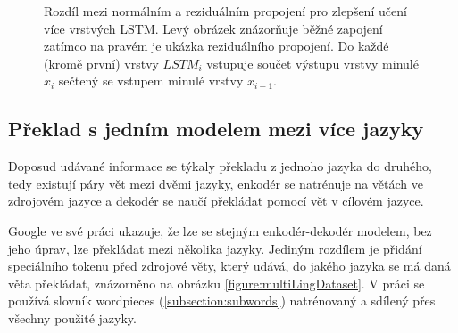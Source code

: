 \begin{figure}[H]
    \begin{center}
    \end{center}
	\caption{Rozdíl mezi normálním a reziduálním propojení pro zlepšení učení více vrstvých LSTM. Levý obrázek znázorňuje běžné zapojení zatímco na pravém je ukázka reziduálního propojení. Do každé (kromě první) vrstvy $LSTM_i$ vstupuje součet výstupu vrstvy minulé $x_i$ sečtený se vstupem minulé vrstvy $x_{i-1}$.}
	\label{img:residuals}
\end{figure}


\subsection{Překlad s jedním modelem mezi více jazyky}
Doposud udávané informace se týkaly překladu z jednoho jazyka do druhého, tedy existují páry vět mezi dvěmi jazyky, enkodér se natrénuje na větách ve zdrojovém jazyce a dekodér se naučí překládat pomocí vět v cílovém jazyce.

Google ve své práci \cite{googleMultiLingual} ukazuje, že lze se stejným enkodér-dekodér modelem, bez jeho úprav, lze překládat mezi několika jazyky.
Jediným rozdílem je přidání speciálního tokenu před zdrojové věty, který udává, do jakého jazyka se má daná věta překládat, znázorněno na obrázku \ref{figure:multiLingDataset}. V práci se používá slovník wordpieces (\ref{subsection:subwords}) natrénovaný a sdílený přes všechny použité jazyky.


